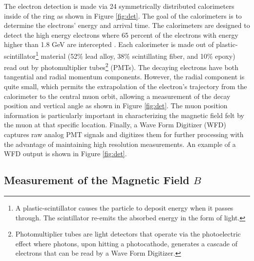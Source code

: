 \documentclass{outhesis}
\begin{document}
The electron detection is made via 24 symmetrically distributed calorimeters inside of the ring as shown in Figure \ref{fig:det}. The goal of the calorimeters is to determine the electrons' energy and arrival time. The calorimeters are designed to detect the high energy electrons where 65 percent of the electrons with energy higher than 1.8 GeV are intercepted \cite{bnl}. Each calorimeter is made out of plastic-scintillator\footnote{A plastic-scintillator causes the particle to deposit energy when it passes through. The scintillator re-emits the absorbed energy in the form of light. } material (52\% lead alloy, 38\% scintillating fiber, and 10\% epoxy) read out by photomultiplier tubes\footnote{Photomultiplier tubes are light detectors that operate via the photoelectric effect where photons, upon hitting a photocathode, generates a cascade of electrons that can be read by a Wave Form Digitizer.} (PMTs). The decaying electrons have both tangential and radial momentum components. However, the radial component is quite small, which permits the extrapolation of the electron's trajectory from the calorimeter to the central muon orbit, allowing a measurement of the decay position and vertical angle as shown in Figure \ref{fig:det}. The muon position information is particularly important in characterizing the magnetic field felt by the muon at that specific location. 
Finally, a Wave Form Digitizer (WFD) captures raw analog PMT signals and digitizes them for further processing with the advantage of maintaining high resolution measurements. An example of a WFD output is shown in Figure \ref{fig:det}.

\subsection{Measurement of the Magnetic Field $B$}
\end{document}
